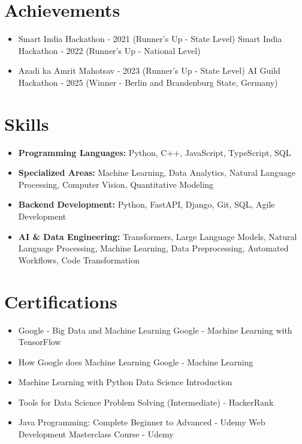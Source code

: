 \documentclass[a4paper,10pt]{article}
\begin{document}
\section*{Achievements}
\begin{itemize}
\item Smart India Hackathon - 2021 (Runner's Up - State Level) \hfill Smart India Hackathon - 2022 (Runner's Up - National Level)
\item Azadi ka Amrit Mahotsav - 2023 (Runner's Up - State Level) \hfill AI Guild Hackathon - 2025 (Winner - Berlin and Brandenburg State, Germany)
\end{itemize}

\section*{Skills}
\begin{itemize}
  \item \textbf{Programming Languages:} Python, C++, JavaScript, TypeScript, SQL
  \item \textbf{Specialized Areas:} Machine Learning, Data Analytics, Natural Language Processing, Computer Vision, Quantitative Modeling
  \item \textbf{Backend Development:} Python, FastAPI, Django, Git, SQL, Agile Development
  \item \textbf{AI \& Data Engineering:} Transformers, Large Language Models, Natural Language Processing, Machine Learning, Data Preprocessing, Automated Workflows, Code Transformation
\end{itemize}

\section*{Certifications}
\begin{itemize}
\item Google - Big Data and Machine Learning \hfill Google - Machine Learning with TensorFlow
\item How Google does Machine Learning \hfill Google - Machine Learning
\item Machine Learning with Python \hfill Data Science Introduction
\item Tools for Data Science \hfill Problem Solving (Intermediate) - HackerRank
\item Java Programming: Complete Beginner to Advanced - Udemy \hfill Web Development Masterclass Course - Udemy
\end{itemize}
\end{document}
